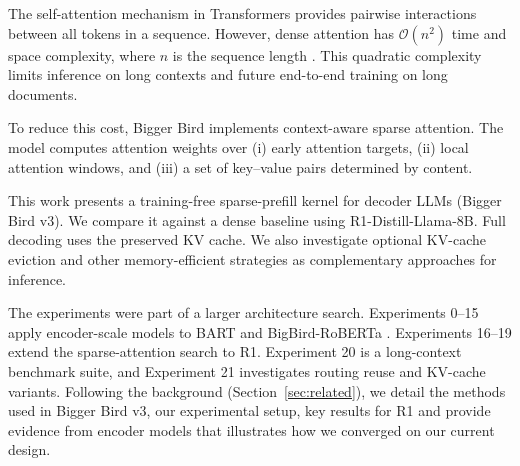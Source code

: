 \documentclass[11pt]{article}
\begin{document}





The self-attention mechanism in Transformers provides pairwise interactions
between all tokens in a sequence. However, dense attention has
$\mathcal{O}(n^2)$ time and space complexity, where $n$ is the sequence
length \citep{vaswani2017attention}. This quadratic complexity limits
inference on long contexts and future end-to-end training on long documents.

To reduce this cost, Bigger Bird implements context-aware sparse
attention. The model computes attention weights over (i) early attention
targets, (ii) local attention windows, and (iii) a set of key--value pairs
determined by content.

This work presents a training-free sparse-prefill kernel for decoder LLMs
(Bigger Bird v3). We compare it against a dense baseline using
R1-Distill-Llama-8B. Full decoding uses the preserved KV cache. We also
investigate optional KV-cache eviction and other memory-efficient strategies
as complementary approaches for inference.

The experiments were part of a larger architecture search. Experiments
0--15 apply encoder-scale models to BART and BigBird-RoBERTa
\citep{zaheer2020bigbird}. Experiments 16--19 extend the sparse-attention
search to R1. Experiment 20 is a long-context benchmark suite, and
Experiment 21 investigates routing reuse and KV-cache variants. Following
the background (Section~\ref{sec:related}), we detail the methods used in Bigger Bird v3, our experimental setup, key results for R1 and provide evidence from encoder models that illustrates how we converged on our current design.
\end{document}
